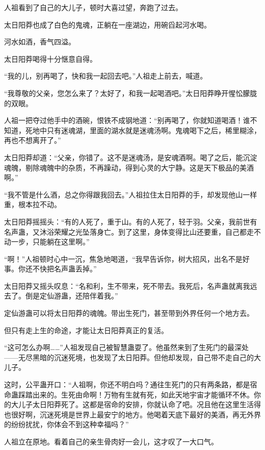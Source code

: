 
\begin{this_body}

人祖看到了自己的大儿子，顿时大喜过望，奔跑了过去。

太日阳莽也成了白色的鬼魂，正躺在一座湖边，用碗舀起河水喝。

河水如酒，香气四溢。

太日阳莽喝得十分惬意自得。

“我的儿，别再喝了，快和我一起回去吧。”人祖走上前去，喊道。

“我尊敬的父亲，您怎么来了？太好了，和我一起喝酒吧。”太日阳莽睁开惺忪朦胧的双眼。

人祖一把夺过他手中的酒碗，恨铁不成钢地道：“别再喝了，你就知道喝酒！谁不知道，死地中只有迷魂湖，里面的湖水就是迷魂汤啊。鬼魂喝下之后，稀里糊涂，再也不想离开了。”

太日阳莽却道：“父亲，你错了。这不是迷魂汤，是安魂酒啊。喝了之后，能沉淀魂魄，剔除魂魄中的杂质，不再躁动，得到心灵的大宁静。这是天下极品的美酒啊。”

“我不管是什么酒，总之你得跟我回去。”人祖拉住太日阳莽的手，却发现他山一样重，根本拉不动。

太日阳莽摇摇头：“有的人死了，重于山。有的人死了，轻于羽。父亲，我前世有名声蛊，又沐浴荣耀之光坠落身亡。到了这里，身体变得比山还要重，自己都走不动一步，只能躺在这里啊。”

“啊！”人祖顿时心中一沉，焦急地喝道，“我早告诉你，树大招风，出名不是好事。你还不快把名声蛊丢掉。”

太日阳莽又摇头叹息：“名和利，生不带来，死不带去。我死后，名声蛊就离我远去了。倒是定仙游蛊，还陪伴着我。”

定仙游蛊可以将太日阳莽的魂魄。带出生死门，甚至带到外界任何一个地方去。

但只有走上生的命途，才能让太日阳莽真正的复活。

“这可怎么办啊……”人祖发现自己被智慧蛊耍了。他虽然来到了生死门的最深处——无尽黑暗的沉迷死境，也发现了太日阳莽。但他却发现，自己带不走自己的大儿子。

这时，公平蛊开口：“人祖啊，你还不明白吗？通往生死门的只有两条路，都是宿命蛊踩踏出来的。生死由命啊！万物有生就有死，如此天地宇宙才能循环不休。你的大儿子太日阳莽死了。这都是宿命的安排，你就认命了吧。况且他在这里生活得也很好啊，沉迷死境是世界上最安宁的地方。他喝着天底下最好的美酒，再无外界的纷纷扰扰，你体会不到这种幸福吗？”

人祖立在原地。看着自己的亲生骨肉好一会儿，这才叹了一大口气。


\end{this_body}
